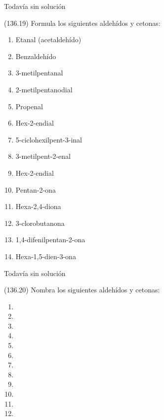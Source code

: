 \documentclass[10pt,a5paper,twoside]{article}
\begin{document}
  \begin{solution}[print=false]
    Todavía sin solución
  \end{solution}




  \begin{exercise}[
      tags    = {},
      topics  = {química, química orgánica, orgánica},
      source  = {FQ 1B MGH 2016, p136, e19},
    ]
    (136.19) Formula los siguientes aldehídos y cetonas:
    \begin{enumerate}
      \item Etanal (acetaldehído)
      \item Benzaldehído
      \item 3-metilpentanal
      \item 2-metilpentanodial
      \item Propenal
      \item Hex-2-endial
      \item 5-ciclohexilpent-3-inal
      \item 3-metilpent-2-enal
      \item Hex-2-endial
      \item Pentan-2-ona
      \item Hexa-2,4-diona
      \item 3-clorobutanona
      \item 1,4-difenilpentan-2-ona
      \item Hexa-1,5-dien-3-ona
    \end{enumerate}
  \end{exercise}

  \begin{solution}[print=false]
    Todavía sin solución
  \end{solution}




  \begin{exercise}[
      tags    = {},
      topics  = {química, química orgánica, orgánica},
      source  = {FQ 1B MGH 2016, p136, e20},
    ]
    (136.20) Nombra los siguientes aldehídos y cetonas:

    \begin{enumerate}
      \item {}
      \item {}
      \item {}
      \item {}
      \item {}
      \item {}
      \item {}
      \item {}
      \item {}
      \item {}
      \item {}
      \item {}
    \end{enumerate}
  \end{exercise}
\end{document}
